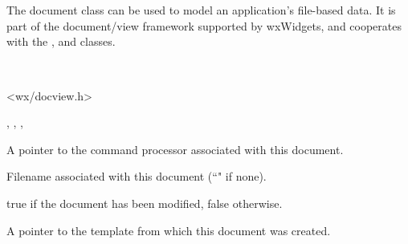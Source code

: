 \section{}\label{wxdocument}

The document class can be used to model an application's file-based
data. It is part of the document/view framework supported by wxWidgets,
and cooperates with the , \rtfsp
and  classes.


\\


<wx/docview.h>


, ,\rtfsp
{}, 


\label{wxdocumentmcommandprocessor}


A pointer to the command processor associated with this document.

\label{wxdocumentmdocumentfile}


Filename associated with this document (``" if none).

\label{wxdocumentmdocumentmodified}


true if the document has been modified, false otherwise.

\label{wxdocumentmdocumenttemplate}


A pointer to the template from which this document was created.

\label{wxdocumentmdocumenttitle}


